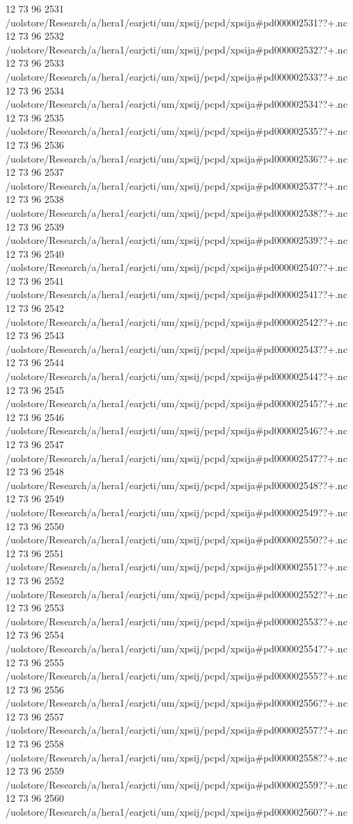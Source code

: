 12 73 96
2531
/uolstore/Research/a/hera1/earjcti/um/xpsij/pcpd/xpsija#pd000002531??+.nc
12 73 96
2532
/uolstore/Research/a/hera1/earjcti/um/xpsij/pcpd/xpsija#pd000002532??+.nc
12 73 96
2533
/uolstore/Research/a/hera1/earjcti/um/xpsij/pcpd/xpsija#pd000002533??+.nc
12 73 96
2534
/uolstore/Research/a/hera1/earjcti/um/xpsij/pcpd/xpsija#pd000002534??+.nc
12 73 96
2535
/uolstore/Research/a/hera1/earjcti/um/xpsij/pcpd/xpsija#pd000002535??+.nc
12 73 96
2536
/uolstore/Research/a/hera1/earjcti/um/xpsij/pcpd/xpsija#pd000002536??+.nc
12 73 96
2537
/uolstore/Research/a/hera1/earjcti/um/xpsij/pcpd/xpsija#pd000002537??+.nc
12 73 96
2538
/uolstore/Research/a/hera1/earjcti/um/xpsij/pcpd/xpsija#pd000002538??+.nc
12 73 96
2539
/uolstore/Research/a/hera1/earjcti/um/xpsij/pcpd/xpsija#pd000002539??+.nc
12 73 96
2540
/uolstore/Research/a/hera1/earjcti/um/xpsij/pcpd/xpsija#pd000002540??+.nc
12 73 96
2541
/uolstore/Research/a/hera1/earjcti/um/xpsij/pcpd/xpsija#pd000002541??+.nc
12 73 96
2542
/uolstore/Research/a/hera1/earjcti/um/xpsij/pcpd/xpsija#pd000002542??+.nc
12 73 96
2543
/uolstore/Research/a/hera1/earjcti/um/xpsij/pcpd/xpsija#pd000002543??+.nc
12 73 96
2544
/uolstore/Research/a/hera1/earjcti/um/xpsij/pcpd/xpsija#pd000002544??+.nc
12 73 96
2545
/uolstore/Research/a/hera1/earjcti/um/xpsij/pcpd/xpsija#pd000002545??+.nc
12 73 96
2546
/uolstore/Research/a/hera1/earjcti/um/xpsij/pcpd/xpsija#pd000002546??+.nc
12 73 96
2547
/uolstore/Research/a/hera1/earjcti/um/xpsij/pcpd/xpsija#pd000002547??+.nc
12 73 96
2548
/uolstore/Research/a/hera1/earjcti/um/xpsij/pcpd/xpsija#pd000002548??+.nc
12 73 96
2549
/uolstore/Research/a/hera1/earjcti/um/xpsij/pcpd/xpsija#pd000002549??+.nc
12 73 96
2550
/uolstore/Research/a/hera1/earjcti/um/xpsij/pcpd/xpsija#pd000002550??+.nc
12 73 96
2551
/uolstore/Research/a/hera1/earjcti/um/xpsij/pcpd/xpsija#pd000002551??+.nc
12 73 96
2552
/uolstore/Research/a/hera1/earjcti/um/xpsij/pcpd/xpsija#pd000002552??+.nc
12 73 96
2553
/uolstore/Research/a/hera1/earjcti/um/xpsij/pcpd/xpsija#pd000002553??+.nc
12 73 96
2554
/uolstore/Research/a/hera1/earjcti/um/xpsij/pcpd/xpsija#pd000002554??+.nc
12 73 96
2555
/uolstore/Research/a/hera1/earjcti/um/xpsij/pcpd/xpsija#pd000002555??+.nc
12 73 96
2556
/uolstore/Research/a/hera1/earjcti/um/xpsij/pcpd/xpsija#pd000002556??+.nc
12 73 96
2557
/uolstore/Research/a/hera1/earjcti/um/xpsij/pcpd/xpsija#pd000002557??+.nc
12 73 96
2558
/uolstore/Research/a/hera1/earjcti/um/xpsij/pcpd/xpsija#pd000002558??+.nc
12 73 96
2559
/uolstore/Research/a/hera1/earjcti/um/xpsij/pcpd/xpsija#pd000002559??+.nc
12 73 96
2560
/uolstore/Research/a/hera1/earjcti/um/xpsij/pcpd/xpsija#pd000002560??+.nc
